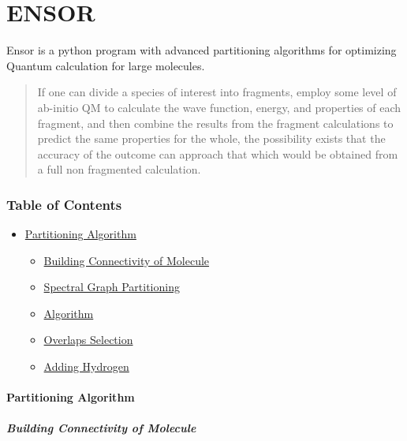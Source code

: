 \documentclass[
]{article}
\author{}
\date{}
\begin{document}
\hypertarget{header-n1582}{%
\section{ENSOR}\label{header-n1582}}

Ensor is a python program with advanced partitioning algorithms for
optimizing Quantum calculation for large molecules.

\begin{quote}
If one can divide a species of interest into fragments, employ some
level of ab-initio QM to calculate the wave function, energy, and
properties of each fragment, and then combine the results from the
fragment calculations to predict the same properties for the whole, the
possibility exists that the accuracy of the outcome can approach that
which would be obtained from a full non fragmented calculation.
\end{quote}

\hypertarget{header-n1587}{%
\subsubsection{Table of Contents}\label{header-n1587}}

\begin{itemize}
\item
  \protect\hyperlink{partitioning-algorithm}{Partitioning Algorithm}

  \begin{itemize}
  \item
    \protect\hyperlink{building-connectivity-of-molecule}{Building
    Connectivity of Molecule}
  \item
    \protect\hyperlink{spectral-graph-partitioning}{Spectral Graph
    Partitioning}
  \item
    \protect\hyperlink{header-n1629}{Algorithm}
  \item
    \protect\hyperlink{overlaps-selection}{Overlaps Selection}
  \item
    \protect\hyperlink{adding-hydrogen}{Adding Hydrogen}
  \end{itemize}
\end{itemize}

\hypertarget{header-n1590}{%
\paragraph{Partitioning Algorithm}\label{header-n1590}}

\hypertarget{header-n1604}{%
\subparagraph{Building Connectivity of Molecule}\label{header-n1604}}
\end{document}

